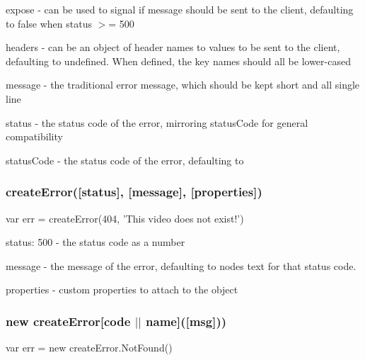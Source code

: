 \begin{DoxyItemize}
\item {\ttfamily expose} -\/ can be used to signal if {\ttfamily message} should be sent to the client, defaulting to {\ttfamily false} when {\ttfamily status} $>$= 500
\item {\ttfamily headers} -\/ can be an object of header names to values to be sent to the client, defaulting to {\ttfamily undefined}. When defined, the key names should all be lower-\/cased
\item {\ttfamily message} -\/ the traditional error message, which should be kept short and all single line
\item {\ttfamily status} -\/ the status code of the error, mirroring {\ttfamily status\+Code} for general compatibility
\item {\ttfamily status\+Code} -\/ the status code of the error, defaulting to {}
\end{DoxyItemize}

\subsubsection*{create\+Error(\mbox{[}status\mbox{]}, \mbox{[}message\mbox{]}, \mbox{[}properties\mbox{]})}


\begin{DoxyCode}
var err = createError(404, 'This video does not exist!')
\end{DoxyCode}



\begin{DoxyItemize}
\item {\ttfamily status\+: 500} -\/ the status code as a number
\item {\ttfamily message} -\/ the message of the error, defaulting to node\textquotesingle{}s text for that status code.
\item {\ttfamily properties} -\/ custom properties to attach to the object
\end{DoxyItemize}

\subsubsection*{new create\+Error\mbox{[}code $\vert$$\vert$ name\mbox{]}(\mbox{[}msg\mbox{]}))}


\begin{DoxyCode}
var err = new createError.NotFound()
\end{DoxyCode}



